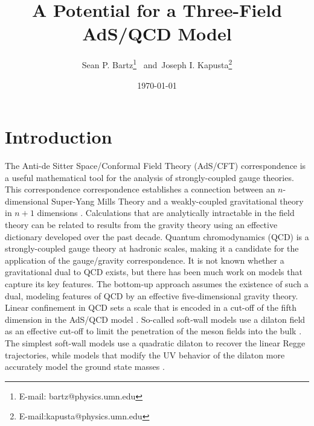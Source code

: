 \documentclass[12pt]{article}
\title{{\bf A Potential for a Three-Field AdS/QCD Model}}
\author{Sean P. Bartz\footnote{E-mail: bartz@physics.umn.edu} \, {\small and}\, Joseph I. Kapusta\footnote{E-mail:kapusta@physics.umn.edu}}
\date{\today}
\begin{document}
\maketitle

\vfill

\section{Introduction}

The Anti-de Sitter Space/Conformal Field Theory (AdS/CFT) correspondence is a useful mathematical tool for the analysis of strongly-coupled gauge theories.
This correspondence correspondence establishes a connection between an $n$-dimensional Super-Yang Mills Theory and a weakly-coupled gravitational theory in $n+1$ dimensions \cite{maldacena, Gubser1998, Witten:1998}. 
Calculations that are analytically intractable in the field theory can be related to results from the gravity theory using an effective dictionary developed over the past decade. 
Quantum chromodynamics (QCD) is a strongly-coupled gauge theory at hadronic scales, making it a candidate for the application of the gauge/gravity correspondence.
It is not known whether a gravitational dual to QCD exists, but there has been much work on models that capture its key features.
The bottom-up approach assumes the existence of such a dual, modeling features of QCD by an effective five-dimensional gravity theory.
Linear confinement in QCD sets a scale that is encoded in a cut-off of the fifth dimension in the AdS/QCD model \cite{stephanov-katz-son, DaRold2005}. 
So-called soft-wall models use a dilaton field as an effective cut-off to limit the penetration of the meson fields into the bulk \cite{karch-katz-son-adsqcd}. 
The simplest soft-wall models use a quadratic dilaton to recover the linear Regge trajectories, while models that modify the UV behavior of the dilaton more accurately model the ground state masses \cite{gherghetta-kelley, bartz-pions, Colangelo2008, Cui2013}.
\end{document}

